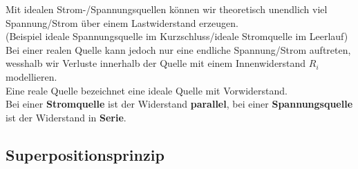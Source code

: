 \iend


Mit idealen Strom-/Spannungsquellen können wir theoretisch unendlich viel Spannung/Strom über einem Lastwiderstand erzeugen. \\
(Beispiel ideale Spannungsquelle im Kurzschluss/ideale Stromquelle im Leerlauf) \\
Bei einer realen Quelle kann jedoch nur eine endliche Spannung/Strom auftreten, wesshalb wir Verluste innerhalb der Quelle mit einem Innenwiderstand $R_i$ modellieren. \\

\beginip
Eine reale Quelle bezeichnet eine ideale Quelle mit Vorwiderstand. \\
Bei einer \textbf{Stromquelle} ist der Widerstand \textbf{parallel}, bei einer \textbf{Spannungsquelle} ist der Widerstand in \textbf{Serie}.
\begin{center}
	\fix
\end{center}
\iend




\subsection{Superpositionsprinzip}

